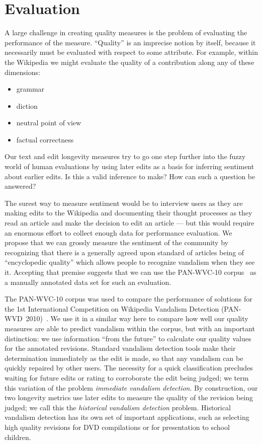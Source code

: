 \section{Evaluation}

A large challenge in creating quality measures is the
problem of evaluating the performance of the measure.
``Quality'' is an imprecise notion by itself, because it
necessarily must be evaluated with respect to some attribute.
For example, within the Wikipedia we might evaluate the quality
of a contribution along any of these dimensions:
\begin{itemize}
\item grammar
\item diction
\item neutral point of view
\item factual correctness
\end{itemize}
Our text and edit longevity measures try to go one step
further into the fuzzy world of human evaluations by using
later edits as a basis for inferring sentiment about earlier edits.
Is this a valid inference to make?
How can such a question be answered?

The surest way to measure sentiment would be to interview
users as they are making edits to the Wikipedia and documenting
their thought processes as they read an article and make the
decision to edit an article --- but this would require an enormous
effort to collect enough data for performance evaluation.
We propose that we can grossly measure the sentiment of the
community by recognizing that there is a generally agreed upon
standard of articles being of ``encyclopedic quality''
which allows people to recognize vandalism when they see it.
Accepting that premise suggests that we can use the PAN-WVC-10
corpus~\cite{Potthast2010a} as a manually annotated data set for
such an evaluation.

The PAN-WVC-10 corpus was used to compare the performance of
solutions for the 1st International Competition on Wikipedia
Vandalism Detection (PAN-WVD~2010)~\cite{Potthast2010b}.
We use it in a similar way here to compare how well our quality
measures are able to predict vandalism within the corpus,
but with an important distinction:
we use information ``from the future'' to calculate our
quality values for the annotated revisions.
Standard vandalism detection tools make their determination
immediately as the edit is made, so that any vandalism can be
quickly repaired by other users.
The necessity for a quick classification precludes waiting
for future edits or rating to corroborate the edit being judged;
we term this variation of the problem \textit{immediate vandalism detection}.
By construction, our two longevity metrics use later edits to
measure the quality of the revision being judged; we call
this the \textit{historical vandalism detection} problem.
Historical vandalism detection has its own set of important
applications, such as selecting high quality revisions for
DVD compilations or for presentation to school children.

